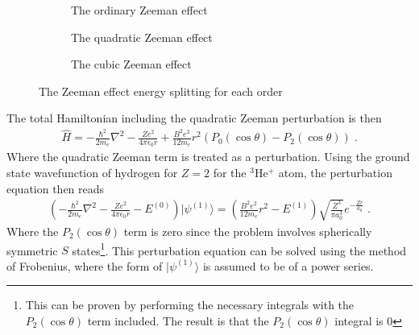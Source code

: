         \begin{figure}[h]
            \centering
            \begin{subfigure}{0.28\linewidth}
                \resizebox{\textwidth}{!}{}
                \caption{The ordinary Zeeman effect}
                \label{fig:a}
            \end{subfigure}
            \hfill
            \begin{subfigure}{0.32\linewidth}
                \resizebox{0.9\textwidth}{!}{}
                \caption{The quadratic Zeeman effect}
                \label{fig:b}
            \end{subfigure}
            \hfill
            \begin{subfigure}{0.28\linewidth}
                \resizebox{\textwidth}{!}{}
                \caption{The cubic Zeeman effect}
                \label{fig:c}
            \end{subfigure}
            \caption{The Zeeman effect energy splitting for each order}
            \label{fig:overall}
        \end{figure}
        \noindent The total Hamiltonian including the quadratic Zeeman perturbation is then 
        \begin{align}
            \hat{H} = - \frac{\hbar^2}{2m_e} \nabla^2 - \frac{Ze^2}{4\pi \epsilon_0 r} + \frac{B^2e^2}{12m_e}r^2 (P_0(\cos \theta) - P_2(\cos \theta))\;. \label{eq:r_sqrd_perturbation}
        \end{align}
        \noindent Where the quadratic Zeeman term is treated as a perturbation. Using the ground state wavefunction of hydrogen for $Z = 2$ for the $^3$He$^+$ atom, the perturbation equation then reads 
        \begin{align}
            \left(- \frac{\hbar^2}{2m_e} \nabla^2 - \frac{Ze^2}{4\pi \epsilon_0 r} - E^{(0)} \right) \vert \psi^{(1)} \rangle = \left(\frac{B^2e^2}{12m_e}r^2 - E^{(1)} \right) \sqrt{\frac{Z^3}{\pi a_0^3}} e^{-\frac{Zr}{a_0}}\;.
        \end{align}
        \noindent Where the $P_2(\cos \theta)$ term is zero since the problem involves spherically symmetric $S$ states\footnote{This can be proven by performing the necessary integrals with the $P_2(\cos\theta)$ term included. The result is that the $P_2(\cos \theta)$ integral is 0}. This perturbation equation can be solved using the method of Frobenius, where the form of $\vert \psi^{(1)} \rangle$ is assumed to be of a power series.
